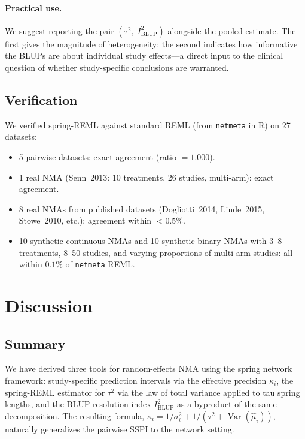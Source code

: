 \documentclass[12pt]{article}
\newcommand{\Var}{\operatorname{Var}}
\begin{document}
\paragraph{Practical use.}
We suggest reporting the pair $(\tau^2,\; I^2_{\mathrm{BLUP}})$
alongside the pooled estimate.  The first gives the magnitude of
heterogeneity; the second indicates how informative the BLUPs are about
individual study effects---a direct input to the clinical question of
whether study-specific conclusions are warranted.

\subsection{Verification}

We verified spring-REML against standard REML (from \texttt{netmeta} in
R) on 27 datasets:
\begin{itemize}
  \item 5 pairwise datasets: exact agreement (ratio $= 1.000$).
  \item 1 real NMA (Senn~2013: 10 treatments, 26 studies, multi-arm):
    exact agreement.
  \item 8 real NMAs from published datasets (Dogliotti~2014,
    Linde~2015, Stowe~2010, etc.): agreement within $< 0.5\%$.
  \item 10 synthetic continuous NMAs and 10 synthetic binary NMAs with
    3--8 treatments, 8--50 studies, and varying proportions of multi-arm
    studies: all within $0.1\%$ of \texttt{netmeta} REML.
\end{itemize}


\section{Discussion}

\subsection{Summary}

We have derived three tools for random-effects NMA using the spring
network framework: study-specific prediction intervals via the effective
precision $\kappa_i$, the spring-REML estimator for $\tau^2$ via
the law of total variance applied to tau spring lengths, and the BLUP
resolution index $I^2_{\mathrm{BLUP}}$ as a byproduct of the same
decomposition.  The resulting formula,
$\kappa_i = 1/\sigma_i^2 + 1/(\tau^2 + \Var(\hat\mu_i))$,
naturally generalizes the pairwise SSPI to the network setting.
\end{document}
